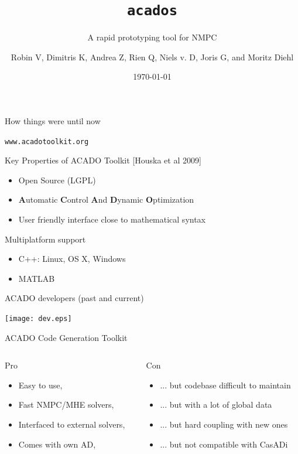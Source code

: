 \documentclass[10pt]{beamer}
\title[\texttt{acados}]{\huge \texttt{acados}}
\subtitle{\large A rapid prototyping tool for NMPC}
\author[R. Verschueren and M. Diehl]{Robin V, Dimitris K, Andrea Z, Rien Q, Niels v. D, Joris G, and Moritz Diehl}
\institute{Systems Control and Optimization laboratory}
\date[\today]{\today }
\begin{document}
\InsertTitle

\begin{frame}{How things were until now}
	\begin{center}
		\Huge \texttt{www.acadotoolkit.org}
	\end{center}
	\vspace{0.5cm}
	
	Key Properties of ACADO Toolkit [Houska et al 2009]
	\begin{itemize}
		\item Open Source (LGPL)
		\item \textbf{A}utomatic \textbf{C}ontrol \textbf{A}nd 	\textbf{D}ynamic \textbf{O}ptimization
		\item User friendly interface close to mathematical syntax
	\end{itemize}
	
	\pause
	
	Multiplatform support
	\begin{itemize}
		\item C++: Linux, OS X, Windows
		\item MATLAB
	\end{itemize}	
\end{frame}


\begin{frame}{ACADO developers (past and current)}
	\begin{center}
		\texttt{[image: dev.eps]}
	\end{center}
\end{frame}

\begin{frame}{ACADO Code Generation Toolkit}
	\begin{columns}
		\begin{column}{0.5\textwidth}
			Pro
			\begin{itemize}
				\item<1-> Easy to use, 
				\item<2-> Fast NMPC/MHE solvers,
				\item<3-> Interfaced to external solvers,
				\item<4-> Comes with own AD,
			\end{itemize}
		\end{column}
		\begin{column}{0.6\textwidth}
			Con
			\begin{itemize}
				\item<1-> ... but codebase difficult to maintain
				\item<2-> ... but with a lot of global data
				\item<3-> ... but hard coupling with new ones
				\item<4-> ... but not compatible with CasADi
			\end{itemize}
		\end{column}	
	\end{columns}
\end{frame}
\end{document}
